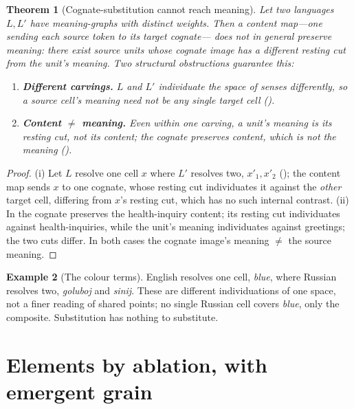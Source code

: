 \documentclass[11pt,a4paper]{article}
\theoremstyle{thmstyle}
\newtheorem{theorem}{Theorem}[section]
\theoremstyle{definition}
\newtheorem{example}[theorem]{Example}
\theoremstyle{remark}
\newcommand{\Lang}{L}
\newcommand{\elt}{x}                   %
\begin{document}
\begin{theorem}[Cognate-substitution cannot reach meaning]
\label{thm:no-cognate}
Let two languages $\Lang,\Lang'$ have meaning-graphs with distinct weights.
Then a content map---one sending each source token to its target cognate---
does not in general preserve meaning: there exist source units whose cognate
image has a different resting cut from the unit's meaning. Two structural
obstructions guarantee this:
\begin{enumerate}[label=\textup{(\roman*)},leftmargin=2.2em]
\item \textbf{Different carvings.} $\Lang$ and $\Lang'$ individuate the space
of senses differently, so a source cell's meaning need not be any single
target cell ().
\item \textbf{Content $\neq$ meaning.} Even within one carving, a unit's
meaning is its resting cut, not its content; the cognate preserves content,
which is not the meaning ().
\end{enumerate}
\end{theorem}

\begin{proof}
\textup{(i)} Let $\Lang$ resolve one cell $\elt$ where $\Lang'$ resolves two,
$\elt'_1,\elt'_2$ (); the content map sends $\elt$ to one
cognate, whose resting cut individuates it against the \emph{other} target
cell, differing from $\elt$'s resting cut, which has no such internal
contrast. \textup{(ii)} In  the cognate preserves the
health-inquiry content; its resting cut individuates against health-inquiries,
while the unit's meaning individuates against greetings; the two cuts differ.
In both cases the cognate image's meaning $\neq$ the source meaning.
\end{proof}

\begin{example}[The colour terms]
\label{ex:colour}
English resolves one cell, \emph{blue}, where Russian resolves two,
\emph{goluboj} and \emph{sinij}. These are different individuations of one
space, not a finer reading of shared points; no single Russian cell covers
\emph{blue}, only the composite. Substitution has nothing to substitute.
\end{example}

\section{Elements by ablation, with emergent grain}
\label{sec:elements}
\end{document}
